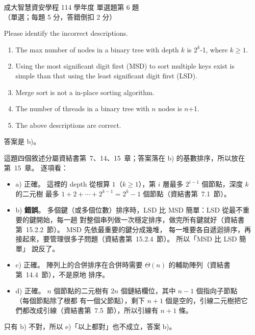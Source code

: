 \begin{pastexam}[label={px:ncku-114-isec-ds-06}]{成大智慧資安學程 114 學年度 單選題第 6 題}
（單選；每題 5 分，答錯倒扣 2 分）

Please identify the incorrect descriptions.
\begin{enumerate}[label=\alph*)]
\item The max number of nodes in a binary tree with depth $k$ is $2^k$-1, where $k\ge 1$.
\item Using the most significant digit first (MSD) to sort multiple keys exist is simple than that using
the least significant digit first (LSD).
\item Merge sort is not a in-place sorting algorithm.
\item The number of threads in a binary tree with $n$ nodes is $n$+1.
\item The above descriptions are correct.
\end{enumerate}
\end{pastexam}

\begin{pastsoln}
答案是 b)。

這題四個敘述分屬資結書第~7、14、15~章；答案落在 b) 的基數排序，所以放在第~15~章。 逐項看：
\begin{itemize}
\item a) 正確。 這裡的 depth 從根算 $1$（$k \ge 1$），第 $i$ 層最多 $2^{i-1}$ 個節點，深度 $k$ 的二元樹
最多 $1 + 2 + \cdots + 2^{k-1} = 2^k - 1$ 個節點（資結書第~7.1~節）。
\item b) \textbf{錯誤}。 多個鍵（或多個位數）排序時，LSD 比 MSD 簡單：LSD 從最不重要的鍵開始，每一趟
對整個串列做一次穩定排序，做完所有鍵就好（資結書第~15.2.2~節）。 MSD 先依最重要的鍵分成幾堆，
每一堆要各自遞迴排序，再接起來，要管理很多子問題（資結書第~15.2.4~節）。 所以「MSD 比 LSD 簡單」
說反了。
\item c) 正確。 陣列上的合併排序在合併時需要 $\Theta(n)$ 的輔助陣列（資結書第~14.4~節），不是原地
排序。
\item d) 正確。 $n$ 個節點的二元樹有 $2n$ 個鏈結欄位，其中 $n - 1$ 個指向子節點（每個節點除了根都
有一個父節點），剩下 $n + 1$ 個是空的，引線二元樹把它們都改成引線（資結書第~7.5~節），所以引線有
$n + 1$ 條。
\end{itemize}
只有 b) 不對，所以 e)「以上都對」也不成立，答案 b)。
\end{pastsoln}
